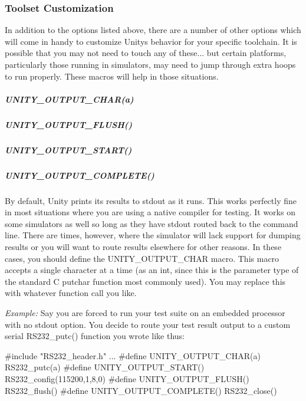 \subsubsection*{Toolset Customization}

In addition to the options listed above, there are a number of other options which will come in handy to customize Unity\textquotesingle{}s behavior for your specific toolchain. It is possible that you may not need to touch any of these... but certain platforms, particularly those running in simulators, may need to jump through extra hoops to run properly. These macros will help in those situations.

\subparagraph*{{\ttfamily U\+N\+I\+T\+Y\+\_\+\+O\+U\+T\+P\+U\+T\+\_\+\+C\+H\+A\+R(a)}}

\subparagraph*{{\ttfamily U\+N\+I\+T\+Y\+\_\+\+O\+U\+T\+P\+U\+T\+\_\+\+F\+L\+U\+S\+H()}}

\subparagraph*{{\ttfamily U\+N\+I\+T\+Y\+\_\+\+O\+U\+T\+P\+U\+T\+\_\+\+S\+T\+A\+R\+T()}}

\subparagraph*{{\ttfamily U\+N\+I\+T\+Y\+\_\+\+O\+U\+T\+P\+U\+T\+\_\+\+C\+O\+M\+P\+L\+E\+T\+E()}}

By default, Unity prints its results to {\ttfamily stdout} as it runs. This works perfectly fine in most situations where you are using a native compiler for testing. It works on some simulators as well so long as they have {\ttfamily stdout} routed back to the command line. There are times, however, where the simulator will lack support for dumping results or you will want to route results elsewhere for other reasons. In these cases, you should define the {\ttfamily U\+N\+I\+T\+Y\+\_\+\+O\+U\+T\+P\+U\+T\+\_\+\+C\+H\+AR} macro. This macro accepts a single character at a time (as an {\ttfamily int}, since this is the parameter type of the standard C {\ttfamily putchar} function most commonly used). You may replace this with whatever function call you like.

{\itshape Example\+:} Say you are forced to run your test suite on an embedded processor with no {\ttfamily stdout} option. You decide to route your test result output to a custom serial {\ttfamily R\+S232\+\_\+putc()} function you wrote like thus\+: 
\begin{DoxyCode}
\textcolor{preprocessor}{#include "RS232\_header.h"}
...
#define UNITY\_OUTPUT\_CHAR(a)    RS232\_putc(a)
\textcolor{preprocessor}{#define UNITY\_OUTPUT\_START()    RS232\_config(115200,1,8,0)}
\textcolor{preprocessor}{#define UNITY\_OUTPUT\_FLUSH()    RS232\_flush()}
\textcolor{preprocessor}{#define UNITY\_OUTPUT\_COMPLETE() RS232\_close()}
\end{DoxyCode}


